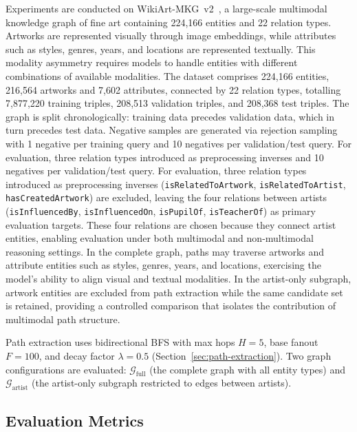 \documentclass[runningheads]{llncs}
\begin{document}
Experiments are conducted on WikiArt-MKG~v2~\cite{efthymiou2026vlkge},
a large-scale multimodal knowledge graph of fine art containing
224,166 entities and 22 relation types. Artworks are represented
visually through image embeddings, while attributes such as styles,
genres, years, and locations are represented textually. This modality
asymmetry requires models to handle entities with different
combinations of available modalities. The dataset comprises 224,166
entities, 216,564 artworks and 7,602 attributes, connected by 22
relation types, totalling 7,877,220 training triples, 208,513
validation triples, and 208,368 test triples. The graph is split
chronologically: training data precedes validation data, which in
turn precedes test data. Negative samples are generated via rejection
sampling with 1 negative per training query and 10 negatives per
validation/test query. For evaluation, three relation types
introduced as preprocessing inverses
and 10 negatives per validation/test query. For evaluation, three
relation types introduced as preprocessing inverses
(\texttt{isRelatedToArtwork}, \texttt{isRelatedToArtist},
\texttt{hasCreatedArtwork}) are excluded, leaving the four
relations between artists (\texttt{isInfluencedBy},
\texttt{isInfluencedOn}, \texttt{isPupilOf}, \texttt{isTeacherOf})
as primary evaluation targets. These four relations are chosen
because they connect artist entities, enabling evaluation under both
multimodal and non-multimodal reasoning settings. In the complete
graph, paths may traverse artworks and attribute entities such as
styles, genres, years, and locations, exercising the model's ability
to align visual and textual modalities. In the artist-only subgraph,
artwork entities are excluded from path extraction while the same
candidate set is retained, providing a controlled comparison that
isolates the contribution of multimodal path structure.

Path extraction uses bidirectional BFS with max hops $H = 5$, base
fanout $F = 100$, and decay factor $\lambda = 0.5$
(Section~\ref{sec:path-extraction}). Two graph configurations are
evaluated: $\mathcal{G}_{\text{full}}$ (the complete graph with all
entity types) and $\mathcal{G}_{\text{artist}}$ (the artist-only
subgraph restricted to edges between artists).

\subsection{Evaluation Metrics}
\label{sec:evaluation-metrics}
\end{document}
